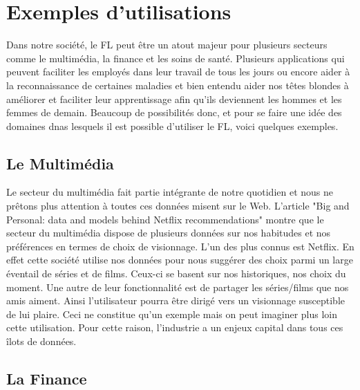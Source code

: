 \documentclass[12pt,a4paper,french]{report}
\begin{document}
\chapter{Exemples d'utilisations}

Dans notre société, le FL peut être un atout majeur pour plusieurs secteurs comme le multimédia, la finance et les soins de santé. Plusieurs applications qui peuvent faciliter les employés dans leur travail de tous les jours ou encore aider à la reconnaissance de certaines maladies et bien entendu aider nos têtes blondes à améliorer et faciliter leur apprentissage afin qu'ils deviennent les hommes et les femmes de demain. Beaucoup de possibilités donc, et pour se faire une idée des domaines dnas lesquels il est possible d'utiliser le FL, voici quelques exemples. 


\section{Le Multimédia}

Le secteur du multimédia fait partie intégrante de notre quotidien et nous ne prêtons plus attention à toutes ces données misent sur le Web. L'article "Big and Personal: data and models behind Netflix recommendations" montre que le secteur du multimédia dispose de plusieurs données sur nos habitudes et nos préférences en termes de choix de visionnage. L'un des plus connus est Netflix. En effet cette société utilise nos données pour nous suggérer des choix parmi un large éventail de séries et de films. Ceux-ci se basent sur nos historiques, nos choix du moment. Une autre de leur fonctionnalité est de partager les séries/films que nos amis aiment. Ainsi l'utilisateur pourra être dirigé vers un visionnage susceptible de lui plaire. Ceci ne constitue qu'un exemple mais on peut imaginer plus loin cette utilisation. Pour cette raison, l'industrie a un enjeux capital dans tous ces îlots de données.\\

\section{La Finance}
\end{document}
